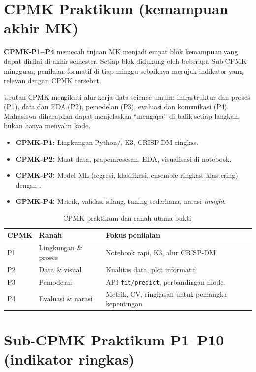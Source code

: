 \documentclass[../main.tex]{subfiles}
\begin{document}
\section{CPMK Praktikum (kemampuan akhir MK)}

\textbf{CPMK-P1--P4} memecah tujuan MK menjadi empat blok kemampuan yang dapat dinilai di akhir semester. Setiap blok didukung oleh beberapa Sub-CPMK mingguan; penilaian formatif di tiap minggu sebaiknya merujuk indikator yang relevan dengan CPMK tersebut.

Urutan CPMK mengikuti alur kerja data science umum: infrastruktur dan proses (P1), data dan EDA (P2), pemodelan (P3), evaluasi dan komunikasi (P4). Mahasiswa diharapkan dapat menjelaskan ``mengapa'' di balik setiap langkah, bukan hanya menyalin kode.

\begin{itemize}[leftmargin=*]
  \item \textbf{CPMK-P1:} Lingkungan Python/\jupyter{}, K3, CRISP-DM ringkas.
  \item \textbf{CPMK-P2:} Muat data, prapemrosesan, EDA, visualisasi di notebook.
  \item \textbf{CPMK-P3:} Model ML (regresi, klasifikasi, ensemble ringkas, klastering) dengan \sklearn{}.
  \item \textbf{CPMK-P4:} Metrik, validasi silang, tuning sederhana, narasi \textit{insight}.
\end{itemize}

\begin{table}[htbp]
\centering
\caption{CPMK praktikum dan ranah utama bukti.}
\label{tab:cpmk-ranah}
\begin{tabular}{@{}llp{7.2cm}@{}}
\toprule
\textbf{CPMK} & \textbf{Ranah} & \textbf{Fokus penilaian} \\
\midrule
P1 & Lingkungan \& proses & Notebook rapi, K3, alur CRISP-DM \\
P2 & Data \& visual & Kualitas data, plot informatif \\
P3 & Pemodelan & API \texttt{fit/predict}, perbandingan model \\
P4 & Evaluasi \& narasi & Metrik, CV, ringkasan untuk pemangku kepentingan \\
\bottomrule
\end{tabular}
\end{table}

\section{Sub-CPMK Praktikum P1--P10 (indikator ringkas)}
\end{document}
